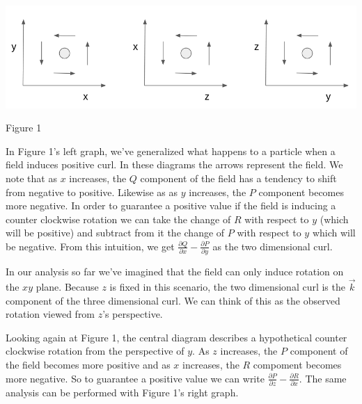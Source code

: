 \documentclass{article}
\begin{document}
				\includegraphics[width=15cm]{curl.png}
					\begin{center}
					Figure 1
				\end{center}
				
			\par \noindent In Figure 1's left graph, we've generalized what happens to a particle when a field induces positive curl. In these diagrams the arrows represent the field. We note that as \(x\) increases, the \(Q\) component of the field has a tendency to shift from negative to positive. Likewise as as \(y\) increases, the \(P\) component becomes more negative. In order to guarantee a positive value if the field is inducing a counter clockwise rotation we can  take the change of \(R\) with respect to \(y\) (which will be positive) and subtract from it the change of \(P\) with respect to \(y\) which will be negative. From this intuition, we get \(\frac{\partial Q}{\partial x} - \frac{\partial P}{\partial y}\) as the two dimensional curl.
			\newline
			\par\noindent In our analysis so far we've imagined that the field can only induce rotation on the \(xy\) plane. Because \(z\) is fixed in this scenario, the two dimensional curl is the \(\vec k\) component of the three dimensional curl. We can think of this as the observed rotation viewed from \(z\)'s perspective.
			\newline
			\par\noindent Looking again at Figure 1, the central diagram describes a hypothetical counter clockwise rotation from the perspective of \(y\). As \(z\) increases, the \(P\) component of the field becomes more positive and as \(x\) increases, the \(R\) compoment becomes more negative. So to guarantee a positive value we can write \(\frac{\partial P}{\partial z} - \frac{\partial R}{\partial x}\). The same analysis can be performed with Figure 1's right graph.
			
\end{document}

